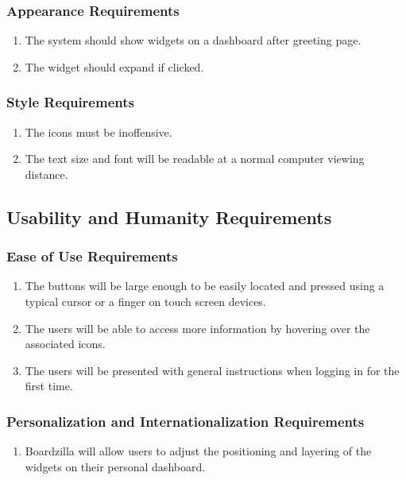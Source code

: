 \documentclass[]{article}
\begin{document}
\subsubsection{Appearance Requirements}
\label{ssub:appearance_requirements}
\begin{enumerate}[{LF}1. ]
  \item The system should show widgets on a dashboard after greeting page.
  \item The widget should expand if clicked.
\end{enumerate}

\subsubsection{Style Requirements}
\label{ssub:style_requirements}
\begin{enumerate}[{LF}1. ]
  \item The icons must be inoffensive.
  \item The text size and font will be readable at a normal computer viewing distance.
\end{enumerate}


\subsection{Usability and Humanity Requirements}
\label{sub:usability_and_humanity_requirements}

\subsubsection{Ease of Use Requirements}
\label{ssub:ease_of_use_requirements}
\begin{enumerate}[{UH}1. ]
    \item The buttons will be large enough to be easily located and pressed using a typical cursor or a finger on touch screen devices.
  \item The users will be able to access more information by hovering over the associated icons.
  \item The users will be presented with general instructions when logging in for the first time.
\end{enumerate}

\subsubsection{Personalization and Internationalization Requirements}
\label{ssub:personalization_and_internationalization_requirements}
\begin{enumerate}[{UH}1. ]
  \item Boardzilla will allow users to adjust the positioning and layering of the widgets on their personal dashboard.
\end{enumerate}
\end{document}
